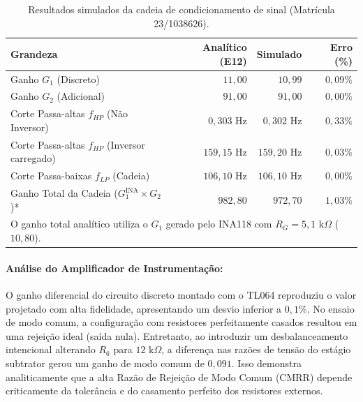 \documentclass[11pt,a4paper]{article}
\begin{document}
\begin{table}[H]
    \centering
    \caption{Resultados simulados da cadeia de condicionamento de sinal (Matrícula 23/1038626).}
    \label{tab:resultados_cardoso}
    \renewcommand{\arraystretch}{1.2}
    \begin{tabular}{@{}lrrr@{}}
    \toprule
    \textbf{Grandeza} & \textbf{Analítico (E12)} & \textbf{Simulado} & \textbf{Erro (\%)} \\
    \midrule    
    Ganho $G_1$ (Discreto) & $11{,}00$ & $10{,}99$ & $0{,}09\%$ \\
    Ganho $G_2$ (Adicional) & $91{,}00$ & $91{,}00$ & $0{,}00\%$ \\
    Corte Passa-altas $f_{HP}$ (Não Inversor) & $0{,}303\text{ Hz}$ & $0{,}302\text{ Hz}$ & $0{,}33\%$ \\
    Corte Passa-altas $f_{HP}$ (Inversor carregado) & $159{,}15\text{ Hz}$ & $159{,}20\text{ Hz}$ & $0{,}03\%$ \\
    Corte Passa-baixas $f_{LP}$ (Cadeia) & $106{,}10\text{ Hz}$ & $106{,}10\text{ Hz}$ & $0{,}00\%$ \\
    Ganho Total da Cadeia ($G_1^{\text{INA}} \times G_2$)* & $982{,}80$ & $972{,}70$ & $1{,}03\%$ \\
    \bottomrule
    \multicolumn{4}{l}{\footnotesize * O ganho total analítico utiliza o $G_1$ gerado pelo INA118 com $R_G = 5{,}1\text{ k}\Omega$ ($10{,}80$).}
    \end{tabular}
\end{table}

\paragraph{Análise do Amplificador de Instrumentação:}
O ganho diferencial do circuito discreto montado com o TL064 reproduziu o valor projetado com alta fidelidade, apresentando um desvio inferior a $0{,}1\%$. No ensaio de modo comum, a configuração com resistores perfeitamente casados resultou em uma rejeição ideal (saída nula). Entretanto, ao introduzir um desbalanceamento intencional alterando $R_6$ para $12\text{ k}\Omega$, a diferença nas razões de tensão do estágio subtrator gerou um ganho de modo comum de $0{,}091$. Isso demonstra analiticamente que a alta Razão de Rejeição de Modo Comum (CMRR) depende criticamente da tolerância e do casamento perfeito dos resistores externos.
\end{document}
